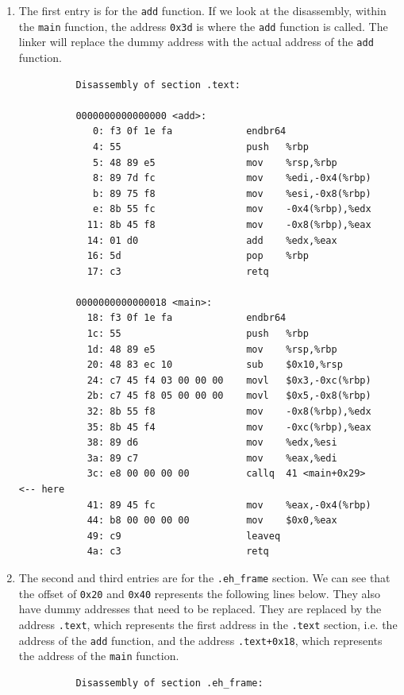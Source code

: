 \documentclass{article}
\begin{document}
      \begin{enumerate}
        \item The first entry is for the \texttt{add} function. If we look at the disassembly, within the \texttt{main} function, the address \texttt{0x3d} is where the \texttt{add} function is called. The linker will replace the dummy address with the actual address of the \texttt{add} function.
        \begin{lstlisting}
          Disassembly of section .text:

          0000000000000000 <add>:
             0:	f3 0f 1e fa          	endbr64 
             4:	55                   	push   %rbp
             5:	48 89 e5             	mov    %rsp,%rbp
             8:	89 7d fc             	mov    %edi,-0x4(%rbp)
             b:	89 75 f8             	mov    %esi,-0x8(%rbp)
             e:	8b 55 fc             	mov    -0x4(%rbp),%edx
            11:	8b 45 f8             	mov    -0x8(%rbp),%eax
            14:	01 d0                	add    %edx,%eax
            16:	5d                   	pop    %rbp
            17:	c3                   	retq   

          0000000000000018 <main>:
            18:	f3 0f 1e fa          	endbr64 
            1c:	55                   	push   %rbp
            1d:	48 89 e5             	mov    %rsp,%rbp
            20:	48 83 ec 10          	sub    $0x10,%rsp
            24:	c7 45 f4 03 00 00 00 	movl   $0x3,-0xc(%rbp)
            2b:	c7 45 f8 05 00 00 00 	movl   $0x5,-0x8(%rbp)
            32:	8b 55 f8             	mov    -0x8(%rbp),%edx
            35:	8b 45 f4             	mov    -0xc(%rbp),%eax
            38:	89 d6                	mov    %edx,%esi
            3a:	89 c7                	mov    %eax,%edi
            3c:	e8 00 00 00 00       	callq  41 <main+0x29>     <-- here
            41:	89 45 fc             	mov    %eax,-0x4(%rbp)
            44:	b8 00 00 00 00       	mov    $0x0,%eax
            49:	c9                   	leaveq 
            4a:	c3                   	retq  
        \end{lstlisting}
        \item The second and third entries are for the \texttt{.eh\_frame} section. We can see that the offset of \texttt{0x20} and \texttt{0x40} represents the following lines below. They also have dummy addresses that need to be replaced. They are replaced by the address \texttt{.text}, which represents the first address in the \texttt{.text} section, i.e. the address of the \texttt{add} function, and the address \texttt{.text+0x18}, which represents the address of the \texttt{main} function.
        \begin{lstlisting}
          Disassembly of section .eh_frame:


\end{lstlisting}
\end{enumerate}
\end{document}
